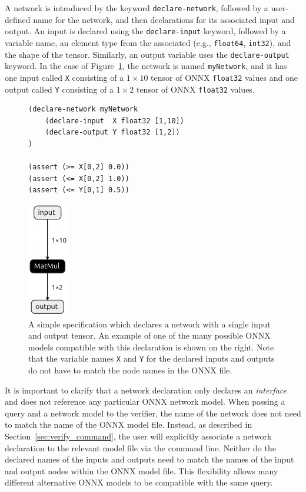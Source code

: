 A network is introduced by the keyword \texttt{declare-network}, followed by a user-defined name for the network, and then declarations for its associated input and output. 
An input is declared using the \texttt{declare-input} keyword, followed by a variable name, an element type from the associated \networkTheory{} (e.g., \texttt{float64}, \texttt{int32}), 
and the shape of the tensor. Similarly, an output variable uses the \texttt{declare-output} keyword. In the case of Figure~\ref{fig:simple-query}, the network is named \texttt{myNetwork}, and it has one input called \texttt{X} consisting of a $1 \times 10$ tensor of ONNX \texttt{float32} values and one output called \texttt{Y} consisting of a $1 \times 2$ tensor of ONNX \texttt{float32} values. 
\begin{figure}[t]
    \begin{minipage}[c]{0.62\textwidth}
        \begin{lstlisting}[style=lbnf]
(declare-network myNetwork
    (declare-input  X float32 [1,10])
    (declare-output Y float32 [1,2])
)

(assert (>= X[0,2] 0.0))
(assert (<= X[0,2] 1.0))
(assert (<= Y[0,1] 0.5))\end{lstlisting}
    \end{minipage}%
    \begin{minipage}[c]{0.35\textwidth}
        \centering
        \includegraphics[height=5cm]{imgs/simple_net.onnx.png}
    \end{minipage}
    \caption{A simple \vnnlib{} specification which declares a network with a single input and output tensor. An example of one of the many possible ONNX models compatible with this declaration is shown on the right. Note that the variable names \texttt{X} and \texttt{Y} for the declared inputs and outputs do not have to match the node names in the ONNX file.}
    \label{fig:simple-query}
\end{figure}


It is important to clarify that a network declaration only declares an \emph{interface} and does not reference any particular ONNX network model. 
When passing a query and a network model to the verifier, the name of the network does not need to match the name of the ONNX model file. 
Instead, as described in Section~\ref{sec:verify_command}, the user will explicitly associate a network declaration to the relevant model file via the command line.
Neither do the declared names of the inputs and outputs need to match the names of the input and output nodes within the ONNX model file. This flexibility allows many different alternative ONNX models to be compatible with the same query.

